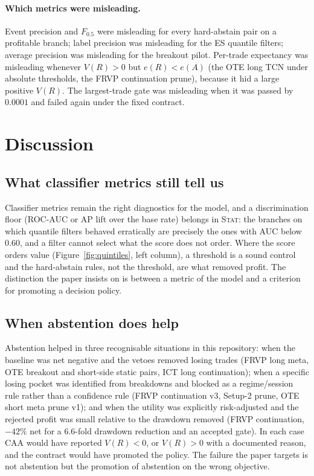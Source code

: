 \documentclass[10pt]{article}
\begin{document}
\paragraph{Which metrics were misleading.} Event precision and $F_{0.5}$ were misleading for every hard-abstain pair on a profitable branch; label precision was misleading for the ES quantile filters; average precision was misleading for the breakout pilot. Per-trade expectancy was misleading whenever $V(R)>0$ but $e(R)<e(A)$ (the OTE long TCN under absolute thresholds, the FRVP continuation prune), because it hid a large positive $V(R)$. The largest-trade gate was misleading when it was passed by $0.0001$ and failed again under the fixed contract.

\section{Discussion}

\subsection{What classifier metrics still tell us}

Classifier metrics remain the right diagnostics for the model, and a discrimination floor (ROC-AUC or AP lift over the base rate) belongs in \textsc{Stat}: the branches on which quantile filters behaved erratically are precisely the ones with AUC below 0.60, and a filter cannot select what the score does not order. Where the score orders value (Figure~\ref{fig:quintiles}, left column), a threshold is a sound control and the hard-abstain rules, not the threshold, are what removed profit. The distinction the paper insists on is between a metric of the model and a criterion for promoting a decision policy.

\subsection{When abstention does help}

Abstention helped in three recognisable situations in this repository: when the baseline was net negative and the vetoes removed losing trades (FRVP long meta, OTE breakout and short-side static pairs, ICT long continuation); when a specific losing pocket was identified from breakdowns and blocked as a regime/session rule rather than a confidence rule (FRVP continuation v3, Setup-2 prune, OTE short meta prune v1); and when the utility was explicitly risk-adjusted and the rejected profit was small relative to the drawdown removed (FRVP continuation, $-42\%$ net for a 6.6-fold drawdown reduction and an accepted gate). In each case CAA would have reported $V(R)<0$, or $V(R)>0$ with a documented reason, and the contract would have promoted the policy. The failure the paper targets is not abstention but the promotion of abstention on the wrong objective.
\end{document}
